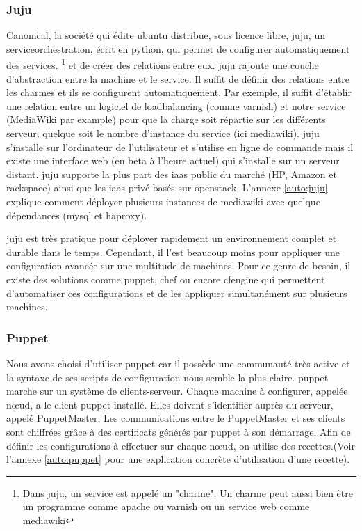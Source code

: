 \documentclass[a4paper,oneside]{report}
\begin{document}
\subsubsection{Juju}
Canonical, la société qui édite \gls{ubuntu} distribue, sous licence libre, \gls{juju}, un \gls{serviceorchestration}, écrit en \gls{python}, qui permet de configurer automatiquement des services.
\footnote{Dans \gls{juju}, un service est appelé un "charme". Un charme peut aussi bien être un programme comme \gls{apache} ou \gls{varnish} ou un service web comme \gls{mediawiki}} et de créer des relations entre eux. 
\gls{juju} rajoute une couche d'abstraction entre la machine et le service. Il suffit de définir des relations entre les charmes et ils se configurent automatiquement. 
Par exemple, il suffit d'établir une relation entre un logiciel de \gls{loadbalancing} (comme \gls{varnish}) et notre service (MediaWiki par example) pour que la charge soit répartie sur les différents serveur, quelque soit le nombre d'instance du service (ici \gls{mediawiki}).
\gls{juju} s'installe sur l'ordinateur de l'utilisateur et s'utilise en ligne de commande mais il existe une interface web (en beta à l'heure actuel) qui s'installe sur un serveur distant.
\gls{juju} supporte la plus part des \gls{iaas} public du marché (HP, Amazon et \gls{rackspace}) ainsi que les \gls{iaas} privé basés sur \gls{openstack}.
L'annexe \ref{auto:juju} explique comment déployer plusieurs instances de \gls{mediawiki} avec quelque dépendances (\gls{mysql} et \gls{haproxy}).\newline


\gls{juju} est très pratique pour déployer rapidement un environnement complet et durable dans le temps. 
Cependant, il l'est beaucoup moins pour appliquer une configuration avancée sur une multitude de machines.
Pour ce genre de besoin, il existe des solutions comme \gls{puppet}, \gls{chef} ou encore \gls{cfengine} qui permettent d'automatiser ces configurations et de les appliquer simultanément sur plusieurs machines.

\subsubsection{Puppet} 
Nous avons choisi d'utiliser \gls{puppet} car il possède une communauté très active et la syntaxe de ses scripts de configuration nous semble la plus claire.
\gls{puppet} marche sur un système de clients-serveur.
Chaque machine à configurer, appelée nœud, a le client \gls{puppet} installé.
Elles doivent s'identifier auprès du serveur, appelé PuppetMaster.
Les communications entre le PuppetMaster et ses clients sont chiffrées grâce à des certificats générés par \gls{puppet} à son démarrage.
Afin de définir les configurations à effectuer sur chaque nœud, on utilise des recettes.(Voir l'annexe \ref{auto:puppet} pour une explication concrète d'utilisation d'une recette).
\end{document}
